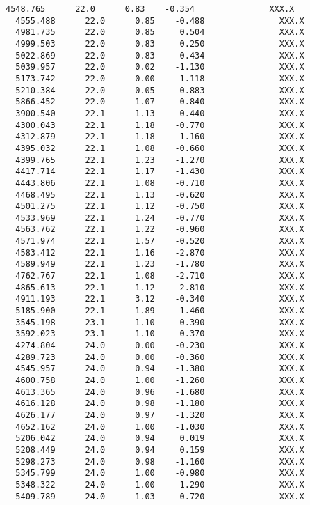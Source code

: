 \documentclass[11pt]{article}
\begin{document}
\begin{Verbatim}[commandchars=\\\{\}]
  4548.765      22.0      0.83    -0.354               XXX.X
  4555.488      22.0      0.85    -0.488               XXX.X
  4981.735      22.0      0.85     0.504               XXX.X
  4999.503      22.0      0.83     0.250               XXX.X
  5022.869      22.0      0.83    -0.434               XXX.X
  5039.957      22.0      0.02    -1.130               XXX.X
  5173.742      22.0      0.00    -1.118               XXX.X
  5210.384      22.0      0.05    -0.883               XXX.X
  5866.452      22.0      1.07    -0.840               XXX.X
  3900.540      22.1      1.13    -0.440               XXX.X
  4300.043      22.1      1.18    -0.770               XXX.X
  4312.879      22.1      1.18    -1.160               XXX.X
  4395.032      22.1      1.08    -0.660               XXX.X
  4399.765      22.1      1.23    -1.270               XXX.X
  4417.714      22.1      1.17    -1.430               XXX.X
  4443.806      22.1      1.08    -0.710               XXX.X
  4468.495      22.1      1.13    -0.620               XXX.X
  4501.275      22.1      1.12    -0.750               XXX.X
  4533.969      22.1      1.24    -0.770               XXX.X
  4563.762      22.1      1.22    -0.960               XXX.X
  4571.974      22.1      1.57    -0.520               XXX.X
  4583.412      22.1      1.16    -2.870               XXX.X
  4589.949      22.1      1.23    -1.780               XXX.X
  4762.767      22.1      1.08    -2.710               XXX.X
  4865.613      22.1      1.12    -2.810               XXX.X
  4911.193      22.1      3.12    -0.340               XXX.X
  5185.900      22.1      1.89    -1.460               XXX.X
  3545.198      23.1      1.10    -0.390               XXX.X
  3592.023      23.1      1.10    -0.370               XXX.X
  4274.804      24.0      0.00    -0.230               XXX.X
  4289.723      24.0      0.00    -0.360               XXX.X
  4545.957      24.0      0.94    -1.380               XXX.X
  4600.758      24.0      1.00    -1.260               XXX.X
  4613.365      24.0      0.96    -1.680               XXX.X
  4616.128      24.0      0.98    -1.180               XXX.X
  4626.177      24.0      0.97    -1.320               XXX.X
  4652.162      24.0      1.00    -1.030               XXX.X
  5206.042      24.0      0.94     0.019               XXX.X
  5208.449      24.0      0.94     0.159               XXX.X
  5298.273      24.0      0.98    -1.160               XXX.X
  5345.799      24.0      1.00    -0.980               XXX.X
  5348.322      24.0      1.00    -1.290               XXX.X
  5409.789      24.0      1.03    -0.720               XXX.X

\end{Verbatim}
\end{document}
